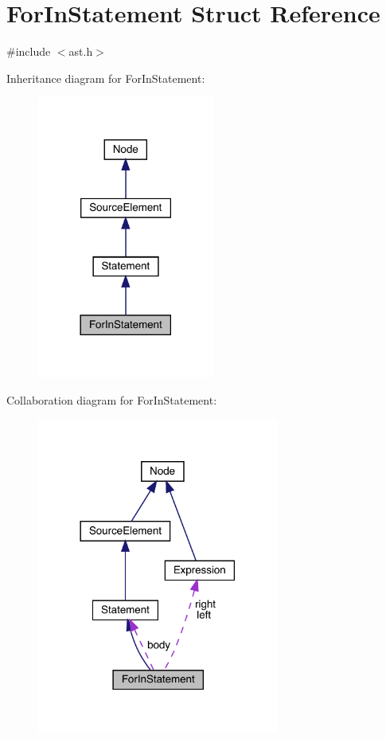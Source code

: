 \hypertarget{struct_for_in_statement}{}\section{For\+In\+Statement Struct Reference}
\label{struct_for_in_statement}


{\ttfamily \#include $<$ast.\+h$>$}



Inheritance diagram for For\+In\+Statement\+:\nopagebreak
\begin{figure}[H]
\begin{center}
\leavevmode
\includegraphics[width=165pt]{struct_for_in_statement__inherit__graph}
\end{center}
\end{figure}


Collaboration diagram for For\+In\+Statement\+:\nopagebreak
\begin{figure}[H]
\begin{center}
\leavevmode
\includegraphics[width=225pt]{struct_for_in_statement__coll__graph}
\end{center}
\end{figure}
